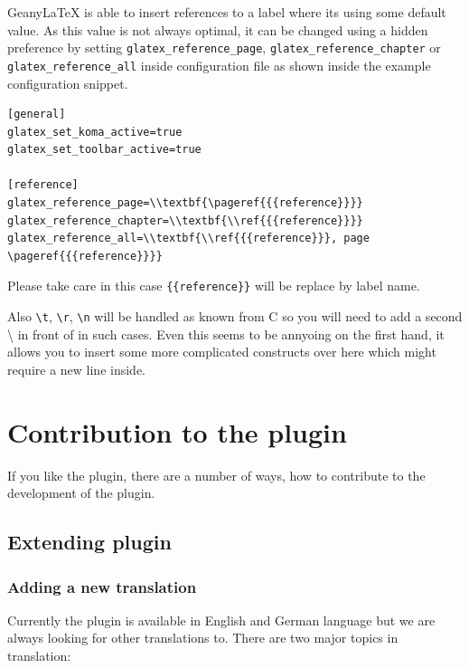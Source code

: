 \documentclass[%
paper=a4,%
fontsize=11pt,%
twoside=false,%
DIV18,
headsepline,
plainheadsepline,
footsepline,
plainfootsepline,
bibliography=totoc,%
listof=totoc,%
BCOR10mm,%
parskip=half,%
openany,%
]{scrartcl}
\begin{document}
Geany\LaTeX{} is able to insert references to a label where its
using some default value. As this value is not always optimal, it
can be changed using a hidden preference by setting
\texttt{glatex\_reference\_page}, \texttt{glatex\_reference\_chapter} or
\texttt{glatex\_reference\_all} inside configuration file as shown inside
the example configuration snippet.

\begin{lstlisting}
[general]
glatex_set_koma_active=true
glatex_set_toolbar_active=true

[reference]
glatex_reference_page=\\textbf{\pageref{{{reference}}}}
glatex_reference_chapter=\\textbf{\\ref{{{reference}}}}
glatex_reference_all=\\textbf{\\ref{{{reference}}}, page \pageref{{{reference}}}}\end{lstlisting}

Please take care in this case \texttt{\{\{reference\}\}} will be
replace by label name.

Also \texttt{\textbackslash{}t}, \texttt{\textbackslash{}r},
\texttt{\textbackslash{}n} will be handled as known from C so you will
need to add a second \textbackslash{} in front of in such cases. Even
this seems to be annyoing on the first hand, it allows you to insert some
more complicated constructs over  here which might require a new line inside.

\section{Contribution to the plugin}
If you like the plugin, there are a number of ways, how to
contribute to the development of the plugin.

\subsection{Extending plugin}

\subsubsection{Adding a new translation}
\label{sec:translating}
Currently the plugin is available in English and German language but
we are always looking for other translations to. There are two major
topics in translation:
\end{document}
